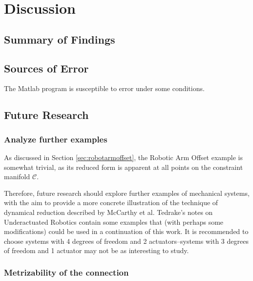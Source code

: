 \documentclass[main.tex]{subfiles}
\begin{document}
\chapter{Discussion}
\section{Summary of Findings}

\section{Sources of Error}
The Matlab program is susceptible to error under some conditions.

\section{Future Research}
\subsection{Analyze further examples}
As discussed in Section \ref{sec:robotarmoffset}, the Robotic Arm Offset example is somewhat trivial, as its reduced form is apparent at all points on the constraint manifold $\mathcal{C}$.

Therefore, future research should explore further examples of mechanical systems, with the aim to provide a more concrete illustration of the technique of dynamical reduction described by McCarthy et al\cite{mccarthy}. 
Tedrake's notes on Underactuated Robotics\cite{underactuated} contain some examples that (with perhaps some modifications) could be used in a continuation of this work. It is recommended to choose systems with 4 degrees of freedom and 2 actuators--systems with 3 degrees of freedom and 1 actuator may not be as interesting to study.

\subsection{Metrizability of the connection}
\end{document}
